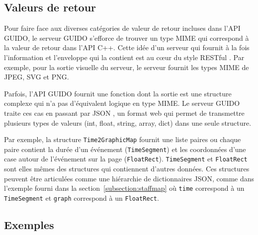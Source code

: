 \documentclass{article}
\begin{document}
\subsection{Valeurs de retour}\label{subsection:values}
Pour faire face aux diverses catégories de valeur de retour incluses dans l'API GUIDO, le serveur GUIDO s'efforce de trouver un type MIME qui correspond à la valeur de retour dans l'API C++. Cette idée d'un serveur qui fournit à la fois l'information et l'enveloppe qui la contient est au c\oe{}ur du style RESTful \cite{richardson2008restful}. Par exemple, pour la sortie visuelle du serveur, le serveur fournit les types MIME de JPEG, SVG et PNG.\par
Parfois, l'API GUIDO fournit une fonction dont la sortie est une structure complexe qui n'a pas d'équivalent logique en type MIME. Le serveur GUIDO traite ces cas en passant par JSON \cite{json}, un format web qui permet de transmettre plusieurs types de valeurs (int, float, string, array, dict) dans une seule structure.\par
Par exemple, la structure \verb=Time2GraphicMap= fournit une liste paires ou chaque paire contient la durée d'un événement (\verb=TimeSegment=) et les coordonnées d'une case autour de l'événement sur la page (\verb=FloatRect=). \verb=TimeSegment= et \verb=FloatRect= sont elles mêmes des structures qui contiennent d'autres données. Ces structures peuvent être articulées comme une hiérarchie de dictionnaires JSON, comme dans l'exemple fourni dans la section~\ref{subsection:staffmap} où \verb=time= correspond à un \verb=TimeSegment= et \verb=graph= correspond à un \verb=FloatRect=.
\subsection{Exemples}
\end{document}
